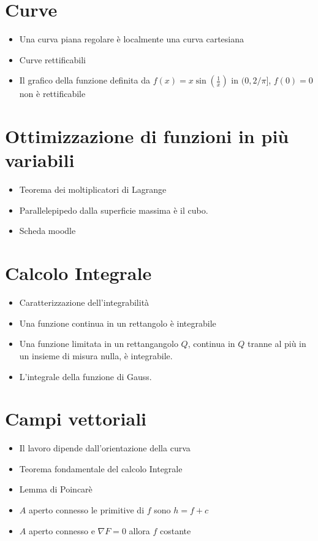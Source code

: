 \documentclass[a4paper]{book}
\numberwithin{equation}{section}
\theoremstyle{plain}
\theoremstyle{definition}
\theoremstyle{remark}
\theoremstyle{example}
\begin{document}
	\section{Curve}
	\begin{itemize}
		\item Una curva piana regolare è localmente una curva cartesiana
		\item Curve rettificabili
		\item Il grafico della funzione definita da $f(x) = x\sin(\frac{1}{x})$ in $(0,2/\pi]$, $f(0) = 0$ non è rettificabile
	\end{itemize}

	\section{Ottimizzazione di funzioni in più variabili}
	\begin{itemize}
		\item Teorema dei moltiplicatori di Lagrange
		\item Parallelepipedo dalla superficie massima è il cubo.
		\item Scheda moodle
	\end{itemize}

	\section{Calcolo Integrale}
	\begin{itemize}
		\item Caratterizzazione dell'integrabilità
		\item Una funzione continua in un rettangolo è integrabile
		\item Una funzione limitata in un rettangangolo $Q$, continua in $Q$ tranne al più in un insieme di misura nulla, è integrabile.
		\item L'integrale della funzione di Gauss.
	\end{itemize}

	\section{Campi vettoriali}
	\begin{itemize}
		\item Il lavoro dipende dall'orientazione della curva
		\item Teorema fondamentale del calcolo Integrale
		\item Lemma di Poincarè
		\item $A$ aperto connesso le primitive di $f$ sono $h=f+c$
		\item $A$ aperto connesso e $\nabla F = 0$ allora $f$ costante
	\end{itemize}
\end{document}

